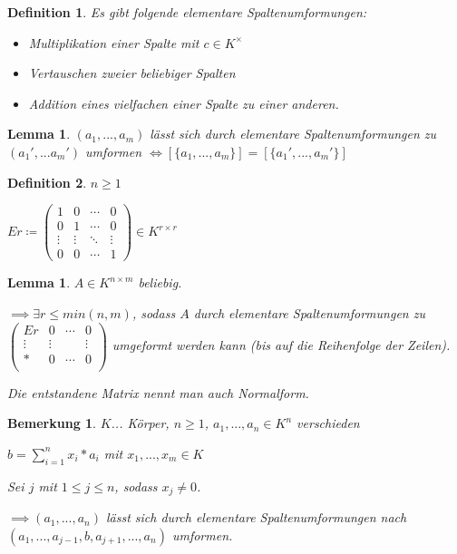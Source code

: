 \documentclass[twocolumn]{article}
\newtheorem{lemma}[theorem]{Lemma}
\newtheorem{definition}{Definition}[section]
\newtheorem*{remark}{Bemerkung}
\newcommand*{\logeq}{\Leftrightarrow}
\begin{document}
\begin{definition}
	Es gibt folgende elementare Spaltenumformungen:
	
	\begin{itemize}
		\item Multiplikation einer Spalte mit $c\in K^{\times}$
		\item Vertauschen zweier beliebiger Spalten
		\item Addition eines vielfachen einer Spalte zu einer anderen.
	\end{itemize}
\end{definition}

\begin{lemma}
	$(a_1,...,a_m)$ lässt sich durch elementare Spaltenumformungen zu $(a_1',...a_m')$ umformen $\logeq [\{a_1,...,a_m\}]=[\{a_1',...,a_m'\}]$
\end{lemma}

\begin{definition}
	$n\geq 1$
	
	$Er\coloneqq \begin{pmatrix}
		1 & 0 & \cdots & 0 \\
		0 & 1 & \cdots & 0 \\
		\vdots & \vdots & \ddots & \vdots \\
		0 & 0 & \cdots & 1
	\end{pmatrix} \in K^{r\times r}$
\end{definition}

\begin{lemma}
	$A \in K^{n\times m}$ beliebig.
	
	$\implies \exists r \leq min(n,m)$, sodass $A$ durch elementare Spaltenumformungen zu $\begin{pmatrix}
		Er & 0 & \cdots & 0\\
		\vdots & \vdots & & \vdots\\
		* & 0 & \cdots & 0\\
	\end{pmatrix}$ umgeformt werden kann (bis auf die Reihenfolge der Zeilen).

	Die entstandene Matrix nennt man auch Normalform.
\end{lemma}

\begin{remark}
	$K$... Körper, $n\geq 1$, $a_1,...,a_n \in K^n$ verschieden
	
	$b=\sum_{i=1}^{n}x_i*a_i$ mit $x_1,...,x_m \in K$
	
	Sei $j$ mit $1 \leq j \leq n$, sodass $x_j \neq 0$.
	
	$\implies (a_1,...,a_n)$ lässt sich durch elementare Spaltenumformungen nach $(a_1,...,a_{j-1},b,a_{j+1},...,a_n)$ umformen.
\end{remark}
\end{document}
